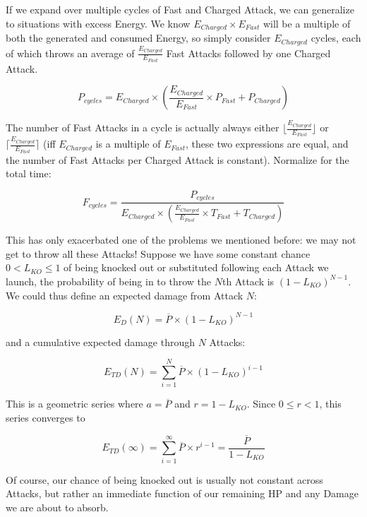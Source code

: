If we expand over multiple cycles of Fast and Charged Attack, we can
 generalize to situations with excess Energy. We know $E_{Charged} \times
 E_{Fast}$ will be a multiple of both the generated and consumed Energy, so
 simply consider $E_{Charged}$ cycles, each of which throws an average of
 $\frac{E_{Charged}}{E_{Fast}}$ Fast Attacks followed by one Charged Attack.

\[ P_{cycles} = E_{Charged} \times (\frac{E_{Charged}}{E_{Fast}} \times P_{Fast} + P_{Charged}) \]

 The number of Fast Attacks in a cycle is actually always either
 $\lfloor\frac{E_{Charged}}{E_{Fast}}\rfloor$
 or $\lceil\frac{E_{Charged}}{E_{Fast}}\rceil$ (iff $E_{Charged}$ is a multiple of
 $E_{Fast}$, these two expressions are equal, and the number of Fast Attacks
 per Charged Attack is constant). Normalize for the total time:

\[ F_{cycles} = \frac{P_{cycles}}{E_{Charged} \times (\frac{E_{Charged}}{E_{Fast}} \times T_{Fast} + T_{Charged})} \]

This has only exacerbated one of the problems we mentioned before: we may
  not get to throw all these Attacks!
Suppose we have some constant chance $0 < L_{KO} \leq 1$ of being knocked out or
 substituted following each Attack we launch, the probability of being
 in to throw the $N$th Attack is $(1 - L_{KO})^{N-1}$.
We could thus define an expected damage from Attack $N$:

\[ E_D(N) = \overline{P} \times (1 - L_{KO})^{N-1} \]

and a cumulative expected damage through $N$ Attacks:

\[ E_{TD}(N) = \sum^N_{i=1} \overline{P} \times (1 - L_{KO})^{i-1} \]

This is a geometric series where $a = \overline{P}$ and $r = 1 - L_{KO}$.
Since $0 \leq r < 1$, this series converges to

\[ E_{TD}(\infty) = \sum^\infty_{i=1} \overline{P} \times r^{i-1} = \frac{\overline{P}}{1 - L_{KO}} \]

Of course, our chance of being knocked out is usually not constant across
Attacks, but rather an immediate function of our remaining HP and any
Damage we are about to absorb.
